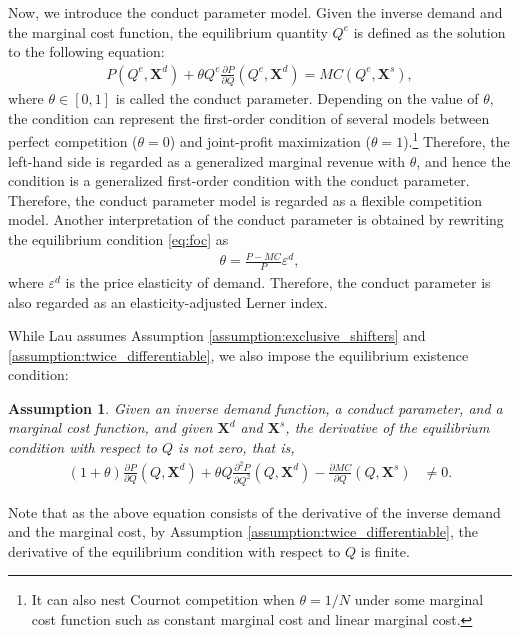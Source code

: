 \documentclass[11pt, a4paper]{article}
\newtheorem{assumption}{Assumption}
\begin{document}
Now, we introduce the conduct parameter model.
Given the inverse demand and the marginal cost function, the equilibrium quantity $Q^e$ is defined as the solution to the following equation:
\begin{align}
    P(Q^e, \bm{X}^{d}) + \theta Q^e\frac{\partial P}{\partial Q}(Q^e, \bm{X}^{d}) = MC(Q^e, \bm{X}^{s}), \label{eq:foc}
\end{align}
where $\theta\in [0,1]$ is called the conduct parameter.
Depending on the value of $\theta$, the condition can represent the first-order condition of several models between perfect competition ($\theta=0$) and joint-profit maximization ($\theta=1$).\footnote{It can also nest Cournot competition when $\theta=1/N$ under some marginal cost function such as constant marginal cost and linear marginal cost.}
Therefore, the left-hand side is regarded as a generalized marginal revenue with $\theta$, and hence the condition is a generalized first-order condition with the conduct parameter.
Therefore, the conduct parameter model is regarded as a flexible competition model.
Another interpretation of the conduct parameter is obtained by rewriting the equilibrium condition \eqref{eq:foc} as
\begin{align}
    \theta = \frac{P - MC}{P}\varepsilon^{d},
\end{align}
where $\varepsilon^{d}$ is the price elasticity of demand.
Therefore, the conduct parameter is also regarded as an elasticity-adjusted Lerner index.

While Lau assumes Assumption \ref{assumption:exclusive_shifters} and \ref{assumption:twice_differentiable}, we also impose the equilibrium existence condition:
\begin{assumption}\label{assumption:unique_equilibrium}
    Given an inverse demand function, a conduct parameter, and a marginal cost function, and given $\bm{X}^{d}$ and $\bm{X}^{s}$, the derivative of the equilibrium condition with respect to $Q$ is not zero, that is,
    \begin{align}
        (1+\theta)\frac{\partial P}{\partial Q}(Q, \bm{X}^{d}) + \theta Q\frac{\partial^2 P}{\partial Q^2}(Q, \bm{X}^{d}) - \frac{\partial MC}{\partial Q}(Q, \bm{X}^{s}) & \ne 0.
    \end{align}
\end{assumption}
Note that as the above equation consists of the derivative of the inverse demand and the marginal cost, by Assumption \ref{assumption:twice_differentiable}, the derivative of the equilibrium condition with respect to $Q$ is finite.
\end{document}
